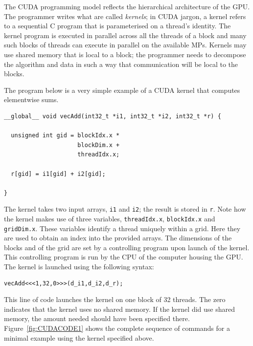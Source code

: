 \documentclass[a4paper]{book}
\begin{document}
The CUDA programming model reflects the hierarchical architecture of the GPU. The 
programmer writes what are called \emph{kernels}; in CUDA jargon, a kernel refers to a sequential 
C program that is parameterised on a thread's identity. The kernel program is executed 
in parallel across all the threads of a block and many such blocks of threads can execute 
in parallel on the available MPs. Kernels may use shared memory that is local to a block; 
the programmer needs to decompose the algorithm and data in such a way that communication 
will be local to the blocks. 


The program below is a very simple example of a CUDA kernel that computes elementwise sums. 

\begin{small}
\begin{Verbatim}[samepage=true]
__global__ void vecAdd(int32_t *i1, int32_t *i2, int32_t *r) {
  
  unsigned int gid = blockIdx.x * 
                     blockDim.x + 
                     threadIdx.x;

  r[gid] = i1[gid] + i2[gid]; 

} 

\end{Verbatim}
\end{small}

\noindent The kernel takes two input arrays, {\tt i1} and {\tt i2}; the result is stored 
in {\tt r}. Note how the kernel makes use of three variables, {\tt threadIdx.x}, 
{\tt blockIdx.x} and {\tt gridDim.x}. These variables identify a thread uniquely within 
a grid. Here they are used to obtain an index into the provided arrays. The dimensions of 
the blocks and of the grid are set by a controlling program upon launch of the kernel. This 
controlling program is run by the CPU of the computer housing the GPU. The kernel is launched 
using the following syntax: 

\begin{small} 
\begin{Verbatim}[samepage=true]
vecAdd<<<1,32,0>>>(d_i1,d_i2,d_r);
\end{Verbatim}
\end{small}

\noindent This line of code launches the kernel on one block of 32 threads. The zero 
indicates that the kernel uses no shared memory. If the kernel did use shared memory, the 
amount needed should have been specified there. Figure~\ref{fig:CUDACODE1} shows the complete 
sequence of commands for a minimal example using the kernel specified above. 
\end{document}
